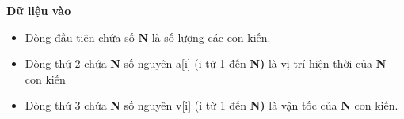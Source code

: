 \textbf{Dữ liệu vào
}
\begin{itemize}
	\item Dòng đầu tiên chứa số \textbf{ N } là số lượng các con kiến.
	\item Dòng thứ 2 chứa \textbf{ N } số nguyên a[i] (i từ 1 đến \textbf{ N) } là vị trí hiện thời của \textbf{ N } con kiến
	\item Dòng thứ 3 chứa \textbf{ N } số nguyên v[i] (i từ 1 đến \textbf{ N) } là vận tốc của \textbf{ N } con kiến.
\end{itemize}